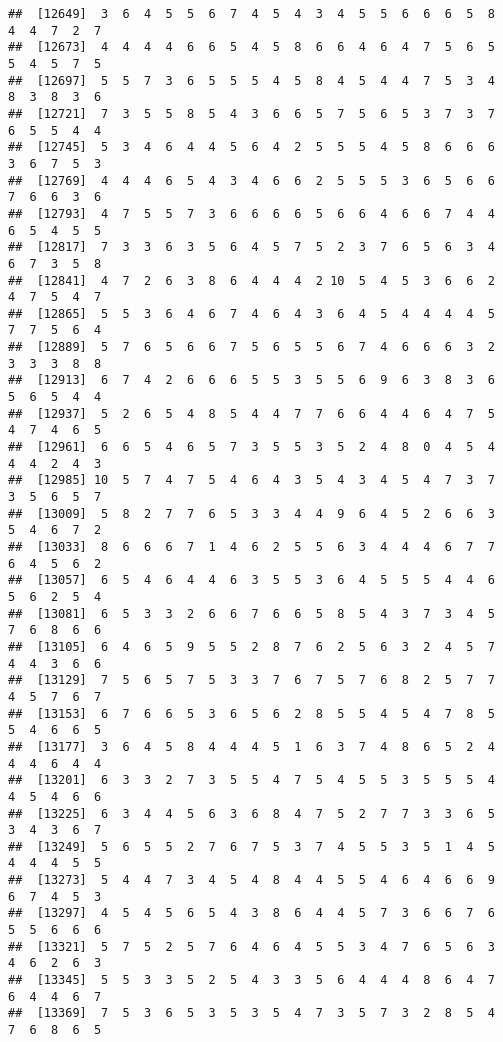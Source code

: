 \documentclass[
]{book}
\begin{document}
\begin{verbatim}
##  [12649]  3  6  4  5  5  6  7  4  5  4  3  4  5  5  6  6  6  5  8  4  4  7  2  7
##  [12673]  4  4  4  4  6  6  5  4  5  8  6  6  4  6  4  7  5  6  5  5  4  5  7  5
##  [12697]  5  5  7  3  6  5  5  5  4  5  8  4  5  4  4  7  5  3  4  8  3  8  3  6
##  [12721]  7  3  5  5  8  5  4  3  6  6  5  7  5  6  5  3  7  3  7  6  5  5  4  4
##  [12745]  5  3  4  6  4  4  5  6  4  2  5  5  5  4  5  8  6  6  6  3  6  7  5  3
##  [12769]  4  4  4  6  5  4  3  4  6  6  2  5  5  5  3  6  5  6  6  7  6  6  3  6
##  [12793]  4  7  5  5  7  3  6  6  6  6  5  6  6  4  6  6  7  4  4  6  5  4  5  5
##  [12817]  7  3  3  6  3  5  6  4  5  7  5  2  3  7  6  5  6  3  4  6  7  3  5  8
##  [12841]  4  7  2  6  3  8  6  4  4  4  2 10  5  4  5  3  6  6  2  4  7  5  4  7
##  [12865]  5  5  3  6  4  6  7  4  6  4  3  6  4  5  4  4  4  4  5  7  7  5  6  4
##  [12889]  5  7  6  5  6  6  7  5  6  5  5  6  7  4  6  6  6  3  2  3  3  3  8  8
##  [12913]  6  7  4  2  6  6  6  5  5  3  5  5  6  9  6  3  8  3  6  5  6  5  4  4
##  [12937]  5  2  6  5  4  8  5  4  4  7  7  6  6  4  4  6  4  7  5  4  7  4  6  5
##  [12961]  6  6  5  4  6  5  7  3  5  5  3  5  2  4  8  0  4  5  4  4  4  2  4  3
##  [12985] 10  5  7  4  7  5  4  6  4  3  5  4  3  4  5  4  7  3  7  3  5  6  5  7
##  [13009]  5  8  2  7  7  6  5  3  3  4  4  9  6  4  5  2  6  6  3  5  4  6  7  2
##  [13033]  8  6  6  6  7  1  4  6  2  5  5  6  3  4  4  4  6  7  7  6  4  5  6  2
##  [13057]  6  5  4  6  4  4  6  3  5  5  3  6  4  5  5  5  4  4  6  5  6  2  5  4
##  [13081]  6  5  3  3  2  6  6  7  6  6  5  8  5  4  3  7  3  4  5  7  6  8  6  6
##  [13105]  6  4  6  5  9  5  5  2  8  7  6  2  5  6  3  2  4  5  7  4  4  3  6  6
##  [13129]  7  5  6  5  7  5  3  3  7  6  7  5  7  6  8  2  5  7  7  4  5  7  6  7
##  [13153]  6  7  6  6  5  3  6  5  6  2  8  5  5  4  5  4  7  8  5  5  4  6  6  5
##  [13177]  3  6  4  5  8  4  4  4  5  1  6  3  7  4  8  6  5  2  4  4  4  6  4  4
##  [13201]  6  3  3  2  7  3  5  5  4  7  5  4  5  5  3  5  5  5  4  4  5  4  6  6
##  [13225]  6  3  4  4  5  6  3  6  8  4  7  5  2  7  7  3  3  6  5  3  4  3  6  7
##  [13249]  5  6  5  5  2  7  6  7  5  3  7  4  5  5  3  5  1  4  5  4  4  4  5  5
##  [13273]  5  4  4  7  3  4  5  4  8  4  4  5  5  4  6  4  6  6  9  6  7  4  5  3
##  [13297]  4  5  4  5  6  5  4  3  8  6  4  4  5  7  3  6  6  7  6  5  5  6  6  6
##  [13321]  5  7  5  2  5  7  6  4  6  4  5  5  3  4  7  6  5  6  3  4  6  2  6  3
##  [13345]  5  5  3  3  5  2  5  4  3  3  5  6  4  4  4  8  6  4  7  6  4  4  6  7
##  [13369]  7  5  3  6  5  3  5  3  5  4  7  3  5  7  3  2  8  5  4  7  6  8  6  5

\end{verbatim}
\end{document}
